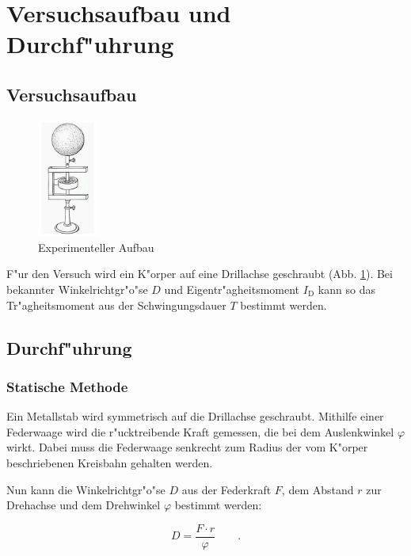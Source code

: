 \section{Versuchsaufbau und Durchf"uhrung} %
\label{sec:durchf_uhrung}

\subsection{Versuchsaufbau} %
\label{sub:aufbau}

\begin{figure}[!h]
	\centering
	\includegraphics[width = 2cm]{img/Drillachse.PNG}
	\caption{Experimenteller Aufbau \cite{anleitung}}
	\label{drillachse}
\end{figure}

F"ur den Versuch wird ein K"orper auf eine Drillachse geschraubt (Abb. \ref{drillachse}). Bei bekannter Winkelrichtgr"o"se $D$ und Eigentr"agheitsmoment $I_\mathrm{D}$ kann so das Tr"agheitsmoment aus der Schwingungsdauer $T$ bestimmt werden.

\subsection{Durchf"uhrung} %
\label{sub:durchf_uhrung}

\subsubsection{Statische Methode} %
\label{sub:statische_methode}

Ein Metallstab wird symmetrisch auf die Drillachse geschraubt. 
Mithilfe einer Federwaage wird die r"ucktreibende Kraft gemessen, die bei dem Auslenkwinkel $\varphi$ wirkt.
Dabei muss die Federwaage senkrecht zum Radius der vom K"orper beschriebenen Kreisbahn gehalten werden.

Nun kann die Winkelrichtgr"o"se $D$ aus der Federkraft $F$, dem Abstand $r$ zur Drehachse und dem Drehwinkel $\varphi$ bestimmt werden:

\begin{equation}
 	D = \frac{F \cdot r}{\varphi} \qquad .
\end{equation} 

